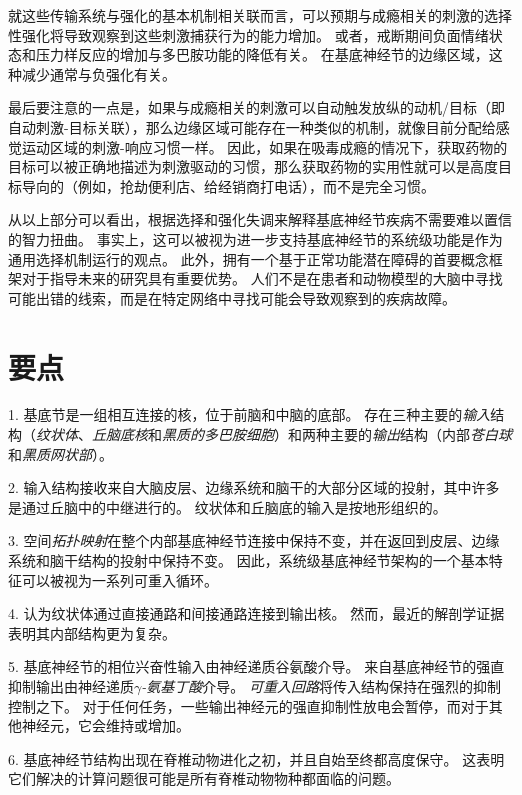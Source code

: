 就这些传输系统与强化的基本机制相关联而言，可以预期与成瘾相关的刺激的选择性强化将导致观察到这些刺激捕获行为的能力增加。
或者，戒断期间负面情绪状态和压力样反应的增加与多巴胺功能的降低有关。
在基底神经节的边缘区域，这种减少通常与负强化有关。


最后要注意的一点是，如果与成瘾相关的刺激可以自动触发放纵的动机/目标（即自动刺激-目标关联），那么边缘区域可能存在一种类似的机制，就像目前分配给感觉运动区域的刺激-响应习惯一样。
因此，如果在吸毒成瘾的情况下，获取药物的目标可以被正确地描述为刺激驱动的习惯，那么获取药物的实用性就可以是高度目标导向的（例如，抢劫便利店、给经销商打电话），而不是完全习惯。


从以上部分可以看出，根据选择和强化失调来解释基底神经节疾病不需要难以置信的智力扭曲。
事实上，这可以被视为进一步支持基底神经节的系统级功能是作为通用选择机制运行的观点。
此外，拥有一个基于正常功能潜在障碍的首要概念框架对于指导未来的研究具有重要优势。
人们不是在患者和动物模型的大脑中寻找可能出错的线索，而是在特定网络中寻找可能会导致观察到的疾病故障。



\section{要点}

1. 基底节是一组相互连接的核，位于前脑和中脑的底部。
存在三种主要的\textit{输入}结构（\textit{纹状体}、\textit{丘脑底核}和\textit{黑质的多巴胺细胞}）和两种主要的\textit{输出}结构（内部\textit{苍白球}和\textit{黑质网状部}）。


2. 输入结构接收来自大脑皮层、边缘系统和脑干的大部分区域的投射，其中许多是通过丘脑中的中继进行的。
纹状体和丘脑底的输入是按地形组织的。


3. 空间\textit{拓扑映射}在整个内部基底神经节连接中保持不变，并在返回到皮层、边缘系统和脑干结构的投射中保持不变。
因此，系统级基底神经节架构的一个基本特征可以被视为一系列可重入循环。


4. 认为纹状体通过直接通路和间接通路连接到输出核。
然而，最近的解剖学证据表明其内部结构更为复杂。


5. 基底神经节的相位兴奋性输入由神经递质谷氨酸介导。
来自基底神经节的强直抑制输出由神经递质\textit{$\gamma$-氨基丁酸}介导。
\textit{可重入回路}将传入结构保持在强烈的抑制控制之下。
对于任何任务，一些输出神经元的强直抑制性放电会暂停，而对于其他神经元，它会维持或增加。


6. 基底神经节结构出现在脊椎动物进化之初，并且自始至终都高度保守。
这表明它们解决的计算问题很可能是所有脊椎动物物种都面临的问题。


